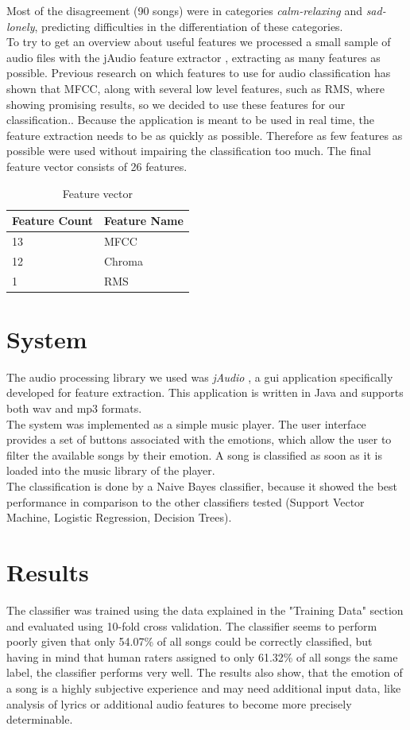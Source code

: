 \documentclass{sigchi-ext}
\begin{document}
Most of the disagreement (90 songs) were in categories \textit{calm-relaxing} and \textit{sad-lonely}, predicting difficulties in the differentiation of these categories.\\

To try to get an overview about useful features we processed a small sample of audio files with the jAudio feature extractor \cite{McEnnis2005}, extracting as many features as possible.
Previous research on which features to use for audio classification has shown that MFCC, along with several low level features, such as RMS, where showing promising results, so we decided to use these features for our classification.\cite{Mckinney2003, Mandel2005, Tzanetakis2001}.  Because the application is meant to be used in real time, the feature extraction needs to be as quickly as possible. Therefore as few features as possible were used without impairing the classification too much. The final feature vector consists of 26 features.

\begin{table}
  \centering
  \begin{tabular}{@{}ll@{}}
    Feature Count & Feature Name \\ \midrule
    13 & MFCC \\
    12 & Chroma \\
    1  & RMS
  \end{tabular}
  \caption{Feature vector}
  \label{feature-vector}
\end{table}

\section{System}
The audio processing library we used was \textit{jAudio} \cite{McEnnis2005}, a gui application specifically developed for feature extraction. This application is written in Java and supports both wav and mp3 formats.\\
The system was implemented as a simple music player. The user interface provides a set of buttons associated with the emotions, which allow the user to filter the available songs by their emotion. A song is classified as soon as it is loaded into the music library of the player.\\
The classification is done by a Naive Bayes classifier, because it showed the best performance in comparison to the other classifiers tested (Support Vector Machine, Logistic Regression, Decision Trees).

\section{Results}
The classifier was trained using the data explained in the "Training Data" section and evaluated using 10-fold cross validation. The classifier seems to perform poorly given that only 54.07\% of all songs could be correctly classified, but having in mind that human raters assigned to only 61.32\% of all songs the same label, the classifier performs very well. The results also show, that the emotion of a song is a highly subjective experience and may need additional input data, like analysis of lyrics or additional audio features to become more precisely determinable.
\end{document}
